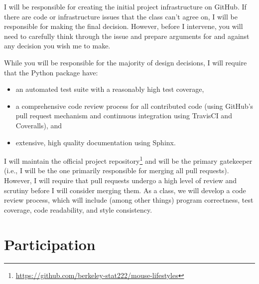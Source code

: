 \documentclass[11pt, oneside]{article}   	%
\begin{document}
I will be responsible for creating the initial project infrastructure on
GitHub.  If there are code or infrastructure issues that the class can't agree
on, I will be responsible for making the final decision.  However, before I
intervene, you will need to carefully think through the issue and prepare
arguments for and against any decision you wish me to make.

While you will be responsible for the majority of design decisions, I will
require that the Python package have:

\begin{itemize}
\item an automated test suite with a reasonably high test coverage,
\item a comprehensive code review process for all contributed code (using
   GitHub's pull request mechanism and continuous integration using
   TravisCI and Coveralls), and
\item extensive, high quality documentation using Sphinx.
\end{itemize}

I will maintain the official project
repository\footnote{\url{https://github.com/berkeley-stat222/mouse-lifestyles}}
and will be the primary gatekeeper (i.e., I will be the one primarily
responsible for merging all pull requests).  However, I will require that pull
requests undergo a high level of review and scrutiny before I will consider
merging them.  As a class, we will develop a code review process, which will
include (among other things) program correctness, test coverage, code
readability, and style consistency.

%
%
%

\section{Participation}
\end{document}
